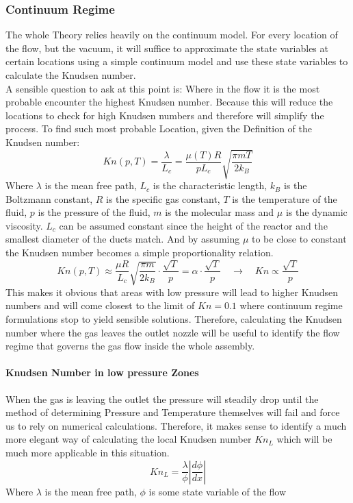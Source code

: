 \subsubsection{Continuum Regime}
	The whole Theory relies heavily on the continuum model.
	For every location of the flow, but the vacuum, it will suffice to approximate the state variables at certain locations using a simple continuum model and use these state variables to calculate the Knudsen number.\\
	A sensible question to ask at this point is: Where in the flow it is the most probable encounter the highest Knudsen number.
	Because this will reduce the locations to check for high Knudsen numbers and therefore will simplify the process.
	To find such most probable Location, given the Definition of the Knudsen number:
	$$
		Kn(p,T) = \frac{\lambda}{L_c} = \frac{\mu(T)R}{pL_c}\sqrt{\frac{\pi m T}{2k_B}}
	$$
	Where $\lambda$ is the mean free path, $L_c$ is the characteristic length, $k_B$ is the Boltzmann constant, $R$ is the specific gas constant, $T$ is the temperature of the fluid, $p$ is the pressure of the fluid, $m$ is the molecular mass and $\mu$ is the dynamic viscosity.
	$L_c$ can be assumed constant since the height of the reactor and the smallest diameter of the ducts match.
	And by assuming $\mu$ to be close to constant the Knudsen number becomes a simple proportionality relation.
	$$
		Kn(p,T)\approx\frac{\mu R}{L_c}\sqrt{\frac{\pi m}{2k_B}}\cdot\frac{\sqrt{T}}{p}=\alpha\cdot\frac{\sqrt{T}}{p}\quad\rightarrow\quad Kn\propto \frac{\sqrt{T}}{p}
	$$
	This makes it obvious that areas with low pressure will lead to higher Knudsen numbers and will come closest to the limit of $Kn=0.1$ where continuum regime formulations stop to yield sensible solutions.
	Therefore, calculating the Knudsen number where the gas leaves the outlet nozzle will be useful to identify the flow regime that governs the gas flow inside the whole assembly.

\paragraph{Knudsen Number in low pressure Zones}

	When the gas is leaving the outlet the pressure will steadily drop until the method of determining Pressure and Temperature themselves will fail and force us to rely on numerical calculations.
	Therefore, it makes sense to identify a much more elegant way of calculating the local Knudsen number $Kn_L$ which will be much more applicable in this situation.
	$$
		K n_L = \frac{\lambda}{\phi} \left| \frac{d\phi}{dx} \right|
	$$
	Where $\lambda$ is the mean free path, $\phi$ is some state variable of the flow
\newpage

